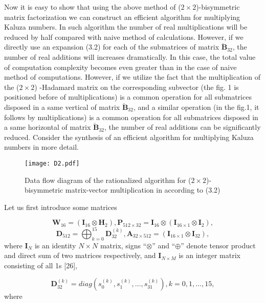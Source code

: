 \documentclass{jtacs}
\numberwithin{equation}{section}
\begin{document}
Now it is easy to show that using the above method of ($2\times2$)-bisymmetric matrix factorization
we can construct an efficient algorithm for multiplying Kaluza numbers. In such algorithm the number of real multiplications will be reduced by half  compared with naive method of calculations. However, if we directly use an expansion (3.2) for
each of the submatrices of matrix $\breve{\mathbf{B}}_{32}$, the number of real additions will increases dramatically.
In this case, the total value of computation complexity becomes even greater than in
the case of naive method of computations. However, if we utilize the fact that the
multiplication of the ($2\times2$) -Hadamard matrix on the corresponding subvector (the fig. 1 is
positioned before of multiplications) is a common operation for all submatrices disposed in
a same vertical of matrix $\breve{\mathbf{B}}_{32}$, and a similar operation (in the fig.1, it follows by multiplications) is a common operation for all submatrices disposed in a same horizontal of matrix $\breve{\mathbf{B}}_{32}$, the number of real additions can be significantly reduced. Consider the synthesis of an efficient algorithm for multiplying Kaluza numbers in more detail.

\begin{figure}[ht]
\centering
  \texttt{[image: D2.pdf]}
  \caption{Data flow diagram of the rationalized algorithm for ($2\times2$)-bisymmetric matrix-vector
multiplication in according to (3.2)}
  \label{fig1}
\end{figure}

Let us first introduce some matrices

\[
\mathbf{W}_{16}=(\mathbf{I}_{16} \otimes \mathbf{H}_{2}),
 \mathbf{P}_{512\times32}=\mathbf{I}_{16}\otimes(\mathbf{I}_{16\times1}\otimes\mathbf{I}_{2}),
\]\[
\mathbf{D}_{512}=\bigoplus_{k=0}^{15}\mathbf{D}_{32}^{(k)},
 \mathbf{A}_{32\times512}=(\mathbf{I}_{16\times1}\otimes\mathbf{I}_{32}),
\]
where $\mathbf{I}_{N}$ is an identity $N\times{N}$ matrix, signs ``$\otimes$'' and ``$\oplus$'' denote tensor product and direct sum of two matrices respectively, and $\mathbf{I}_{N\times{M}}$  is an integer matrix consisting of all 1s [26],

\[
\mathbf{D}_{32}^{(k)}=diag(s_{0}^{(k)},s_{1}^{(k)},\dots,s_{31}^{(k)}), k=0,1,\dots,15,
\]
where
\end{document}

